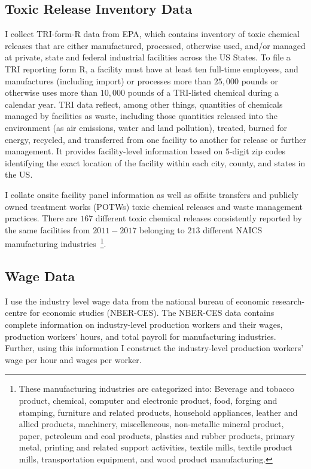\documentclass[12pt, english]{article}
\begin{document}
    \subsection{Toxic Release Inventory Data}\label{subsec:toxic-release-inventory-data}
    I collect TRI-form-R data from EPA, which contains inventory of toxic chemical releases that are either manufactured, processed, otherwise used, and/or managed at private, state and federal industrial facilities across the US States. To file a TRI reporting form R, a facility must have at least ten full-time employees, and manufactures (including import) or processes more than $25,000$ pounds or otherwise uses more than $10,000$ pounds of a TRI-listed chemical during a calendar year. TRI data reflect, among other things, quantities of chemicals managed by facilities as waste, including those quantities released into the environment (as air emissions, water and land pollution), treated, burned for energy, recycled, and transferred from one facility to another for release or further management. It provides facility-level information based on $5$-digit zip codes identifying the exact location of the facility within each city, county, and states in the US.

    I collate onsite facility panel information as well as offsite transfers and publicly owned treatment works (POTWs) toxic chemical releases and waste management practices. There are $167$ different toxic chemical releases consistently reported by the same facilities from $2011-2017$ belonging to $213$ different NAICS manufacturing industries~\footnote{\tiny These manufacturing industries are categorized into: Beverage and tobacco product, chemical, computer and electronic product, food, forging and stamping, furniture and related products, household appliances, leather and allied products, machinery, miscelleneous, non-metallic mineral product, paper, petroleum and coal products, plastics and rubber products, primary metal, printing and related support activities, textile mills, textile product mills, transportation equipment, and wood product manufacturing.}.

    \subsection{Wage Data}\label{subsec:wage-data}
    I use the industry level wage data from the national bureau of economic research-centre for economic studies (NBER-CES). The NBER-CES data contains complete information on industry-level production workers and their wages, production workers' hours, and total payroll for manufacturing industries. Further, using this information I construct the industry-level production workers' wage per hour and wages per worker.
\end{document}
